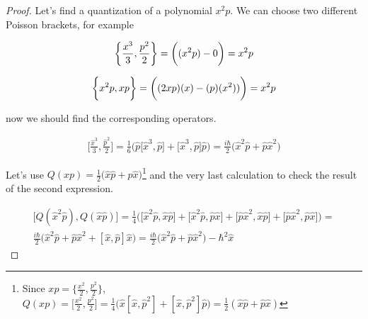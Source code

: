 \begin{proof}
    Let's find a quantization of a polynomial $x^{2} p$. We can choose two different Poisson brackets, for example

    \begin{equation}
        \bigg\{\frac{x^{3}}{3}, \frac{p^{2}}{2}\bigg\} = \bigg((x^{2} p) - 0\bigg) = x^{2} p \\
    \end{equation}

    \begin{equation}
        \bigg\{x^{2} p, x p\bigg\} = \bigg((2 x p) (x) - (p) (x^{2}))\bigg) = x^{2} p \\
    \end{equation}

    now we should find the corresponding operators.

    \begin{equation*}
        \begin{gathered}
            \bigg[\frac{\hat{x}^{3}}{3}, \frac{\hat{p}^{2}}{2}\bigg] = \frac{1}{6} \bigg(\hat{p} \big[\hat{x}^{3}, \hat{p}\big] + \big[\hat{x}^{3}, \hat{p}\big] \hat{p}\bigg) = 
            \frac{i\hbar}{2} \big(\hat{x}^{2} \hat{p} + \hat{p}\hat{x}^{2}\big)
        \end{gathered}
    \end{equation*}

    Let's use $Q (xp) = \frac{1}{2}\big(\hat{x} \hat{p} + \hat{p} \hat{x}\big)$\footnote{Since $xp = \big\{\frac{x^{2}}{2}, \frac{p^{2}}{2} \big\}$, $Q(xp) = 
    \big[\frac{x^{2}}{2}, \frac{p^{2}}{2} \big] = \frac{1}{4} \big(\hat{x} [\hat{x}, \hat{p}^{2}] + [\hat{x}, \hat{p}^{2}] \hat{p}\big) = \frac{1}{2} (\hat{x} \hat{p} + \hat{p} \hat{x})$} and
    the very last calculation to check the result of the second expression.

    \begin{equation*}
        \begin{gathered}
            \bigg[Q(\hat{x}^{2} \hat{p}), Q(\hat{x} \hat{p})\bigg] = \frac{1}{4} \bigg( \big[\hat{x}^{2}\hat{p}, \hat{x}\hat{p}\big] + \big[\hat{x}^{2}\hat{p}, \hat{p}\hat{x}\big] + \big[\hat{p}\hat{x}^{2}, \hat{x}\hat{p}\big] + \big[\hat{p}\hat{x}^{2}, \hat{p}\hat{x}\big] \bigg) = \\
            \frac{i \hbar}{2} \bigg(\hat{x}^{2}\hat{p} + \hat{p}\hat{x}^{2} + [\hat{x}, \hat{p}] \hat{x}\bigg) = \frac{i \hbar}{2} \bigg(\hat{x}^{2}\hat{p} + \hat{p}\hat{x}^{2}\bigg) - \hbar^{2} \hat{x}
        \end{gathered}
    \end{equation*}


\end{proof}
